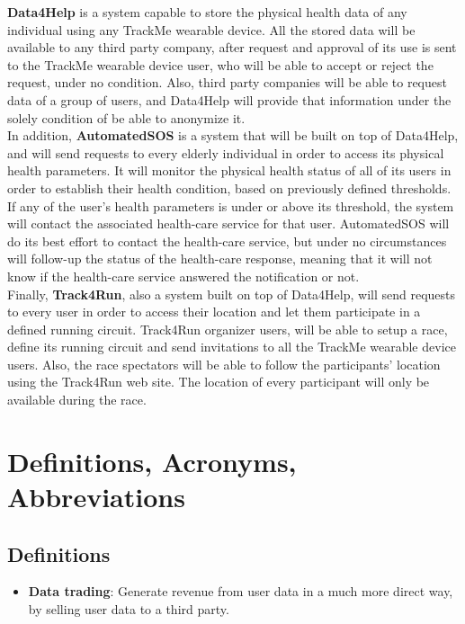 \documentclass[a4paper, hidelinks, 12pt]{report}
\begin{document}
	\textbf{Data4Help} is a system capable to store the physical health data of any individual using any TrackMe wearable device. All the stored data will be available to any third party company, after request and approval of its use is sent to the TrackMe wearable device user, who will be able to accept or reject the request, under no condition. Also, third party companies will be able to request data of a group of users, and Data4Help will provide that information under the solely condition of be able to anonymize it.\\
	
	In addition, \textbf{AutomatedSOS} is a system that will be built on top of Data4Help, and will send requests to every elderly individual in order to access its physical health parameters. It will monitor the physical health status of all of its users in order to establish their health condition, based on previously defined thresholds. If any of the user's health parameters is under or above its threshold, the system will contact the associated health-care service for that user. AutomatedSOS will do its best effort to contact the health-care service, but under no circumstances will follow-up the status of the health-care response, meaning that it will not know if the health-care service answered the notification or not.\\
	
	Finally, \textbf{Track4Run}, also a system built on top of Data4Help, will send requests to every user in order to access their location and let them participate in a defined running circuit. Track4Run organizer users, will be able to setup a race, define its running circuit and send invitations to all the TrackMe wearable device users. Also, the race spectators will be able to follow the participants' location using the Track4Run web site. The location of every participant will only be available during the race.
	
	\section{Definitions, Acronyms, Abbreviations}
	\subsection{Definitions}
	\begin{itemize}
		\item{\textbf{Data trading}}: Generate revenue from user data in a much more direct way, by selling user data to a third party.
	\end{itemize}
	
\end{document}
